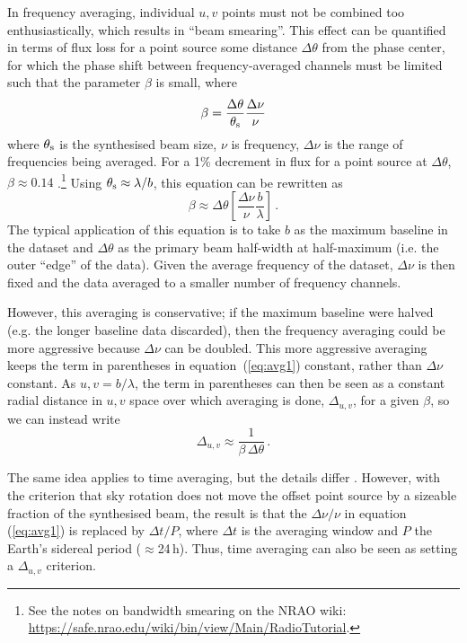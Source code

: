 \documentclass[fleqn,usenatbib]{mnras}
\begin{document}
In frequency averaging, individual $u,v$ points must not be combined too enthusiastically, which results in ``beam smearing''. This effect can be quantified in terms of flux loss for a point source some distance $\Delta \theta$ from the phase center, for which the phase shift between frequency-averaged channels must be limited such that the parameter $\beta$ is small, where
\begin{equation}
    \beta = \frac{\Delta \theta}{\theta_{\rm s}} \frac{\Delta \nu}{\nu}
\end{equation}
where $\theta_{\rm s}$ is the synthesised beam size, $\nu$ is frequency, $\Delta \nu$ is the range of frequencies being averaged. For a 1\% decrement in flux for a point source at $\Delta \theta$, $\beta \approx 0.14$ \citep{1989ASPC....6..247B}.\footnote{See the notes on bandwidth smearing on the NRAO wiki: \href{https://safe.nrao.edu/wiki/bin/view/Main/RadioTutorial}{https://safe.nrao.edu/wiki/bin/view/Main/RadioTutorial}.} Using $\theta_{\rm s} \approx \lambda/b$, this equation can be rewritten as
\begin{equation}\label{eq:avg1}
    \beta \approx \Delta \theta \left[ \frac{\Delta \nu}{\nu} \frac{b}{\lambda} \right] \, .
\end{equation}
The typical application of this equation is to take $b$ as the maximum baseline in the dataset and $\Delta \theta$ as the primary beam half-width at half-maximum (i.e. the outer ``edge'' of the data). Given the average frequency of the dataset, $\Delta \nu$ is then fixed and the data averaged to a smaller number of frequency channels.

However, this averaging is conservative; if the maximum baseline were halved (e.g. the longer baseline data discarded), then the frequency averaging could be more aggressive because $\Delta \nu$ can be doubled. This more aggressive averaging keeps the term in parentheses in equation~(\ref{eq:avg1}) constant, rather than $\Delta \nu$ constant. As $u,v = b/\lambda$, the term in parentheses can then be seen as a constant radial distance in $u,v$ space over which averaging is done, $\Delta_{u,v}$, for a given $\beta$, so we can instead write
\begin{equation}\label{eq:avg2}
    \Delta_{u,v} \approx \frac{1}{\beta \, \Delta \theta} \, .
\end{equation}

The same idea applies to time averaging, but the details differ \citep{1989ASPC....6..247B}. However, with the criterion that sky rotation does not move the offset point source by a sizeable fraction of the synthesised beam, the result is that the $\Delta \nu / \nu$ in equation (\ref{eq:avg1}) is replaced by $\Delta t / P$, where $\Delta t$ is the averaging window and $P$ the Earth's sidereal period ($\approx$24\,h). Thus, time averaging can also be seen as setting a $\Delta_{u,v}$ criterion.
\end{document}
